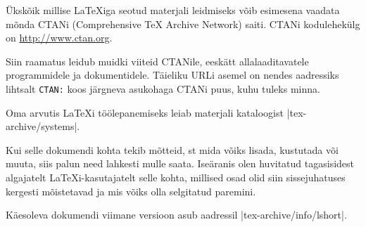 \bigskip
\noindent Ükskõik millise \LaTeX iga seotud materjali leidmiseks võib
esimesena vaadata mõnda CTANi (Comprehensive \TeX{} Archive
Network) saiti. CTANi kodulehekülg on \url{http://www.ctan.org}.

Siin raamatus leidub muidki viiteid CTANile, eeskätt allalaaditavatele
programmidele ja dokumentidele. Täieliku URLi asemel on nendes
aadressiks lihtsalt \texttt{CTAN:} koos järgneva asukohaga CTANi puus,
kuhu tuleks minna.

Oma arvutis \LaTeX i töölepanemiseks leiab materjali kataloogist
\CTAN|tex-archive/systems|.

\noindent Kui selle dokumendi kohta tekib mõtteid, st mida võiks lisada,
kustutada või muuta, siis palun need lahkesti mulle saata. Iseäranis
olen huvitatud tagasisidest algajatelt \LaTeX i-kasutajatelt selle
kohta, millised osad olid siin sissejuhatuses kergesti mõistetavad ja
mis võiks olla selgitatud paremini.

\bigskip
\begin{verse}
%
\end{verse}
\noindent Käesoleva dokumendi viimane versioon asub aadressil
\CTAN|tex-archive/info/lshort|.

\endinput



%


